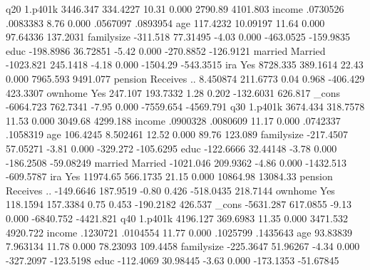 q20          {\VBAR}
     1.p401k {\VBAR}   3446.347   334.4227    10.31   0.000      2790.89    4101.803
      income {\VBAR}   .0730526   .0083383     8.76   0.000     .0567097    .0893954
         age {\VBAR}   117.4232   10.09197    11.64   0.000     97.64336    137.2031
  familysize {\VBAR}   -311.518   77.31495    -4.03   0.000    -463.0525   -159.9835
        educ {\VBAR}  -198.8986   36.72851    -5.42   0.000    -270.8852   -126.9121
             {\VBAR}
     married {\VBAR}
    Married  {\VBAR}  -1023.821   245.1418    -4.18   0.000     -1504.29   -543.3515
             {\VBAR}
         ira {\VBAR}
        Yes  {\VBAR}   8728.335   389.1614    22.43   0.000     7965.593    9491.077
             {\VBAR}
     pension {\VBAR}
Receives ..  {\VBAR}   8.450874   211.6773     0.04   0.968     -406.429    423.3307
             {\VBAR}
     ownhome {\VBAR}
        Yes  {\VBAR}    247.107   193.7332     1.28   0.202    -132.6031     626.817
       _cons {\VBAR}  -6064.723   762.7341    -7.95   0.000    -7559.654   -4569.791
q30          {\VBAR}
     1.p401k {\VBAR}   3674.434   318.7578    11.53   0.000      3049.68    4299.188
      income {\VBAR}   .0900328   .0080609    11.17   0.000     .0742337    .1058319
         age {\VBAR}   106.4245   8.502461    12.52   0.000        89.76     123.089
  familysize {\VBAR}  -217.4507   57.05271    -3.81   0.000     -329.272   -105.6295
        educ {\VBAR}  -122.6666   32.44148    -3.78   0.000    -186.2508   -59.08249
             {\VBAR}
     married {\VBAR}
    Married  {\VBAR}  -1021.046   209.9362    -4.86   0.000    -1432.513   -609.5787
             {\VBAR}
         ira {\VBAR}
        Yes  {\VBAR}   11974.65   566.1735    21.15   0.000     10864.98    13084.33
             {\VBAR}
     pension {\VBAR}
Receives ..  {\VBAR}  -149.6646   187.9519    -0.80   0.426    -518.0435    218.7144
             {\VBAR}
     ownhome {\VBAR}
        Yes  {\VBAR}   118.1594   157.3384     0.75   0.453    -190.2182     426.537
       _cons {\VBAR}  -5631.287   617.0855    -9.13   0.000    -6840.752   -4421.821
q40          {\VBAR}
     1.p401k {\VBAR}   4196.127   369.6983    11.35   0.000     3471.532    4920.722
      income {\VBAR}   .1230721   .0104554    11.77   0.000     .1025799    .1435643
         age {\VBAR}   93.83839   7.963134    11.78   0.000     78.23093    109.4458
  familysize {\VBAR}  -225.3647   51.96267    -4.34   0.000    -327.2097   -123.5198
        educ {\VBAR}  -112.4069   30.98445    -3.63   0.000    -173.1353   -51.67845
             {\VBAR}
